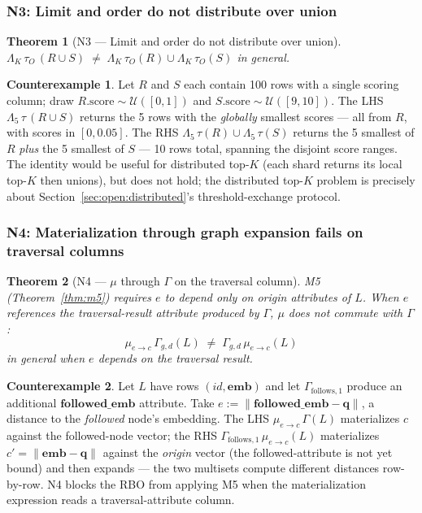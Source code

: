 \documentclass[acmsmall,review,anonymous]{acmart}
\theoremstyle{plain}
\newtheorem{theorem}{Theorem}
\theoremstyle{definition}
\newtheorem{counterexample}{Counterexample}
\newcommand{\vect}[1]{\boldsymbol{#1}}
\theoremstyle{remark}
\begin{document}
\subsubsection{N3: Limit and order do not distribute over union}

\begin{theorem}[N3 --- Limit and order do not distribute over union]\label{thm:n3}
$\Lambda_K\, \tau_O\, (R \cup S) \;\neq\; \Lambda_K\, \tau_O(R) \cup
\Lambda_K\, \tau_O(S)$ in general.
\end{theorem}

\begin{counterexample}\label{ce:n3}
Let $R$ and $S$ each contain 100 rows with a single scoring
column; draw $R.\mathrm{score} \sim \mathcal{U}([0,1])$ and
$S.\mathrm{score} \sim \mathcal{U}([9,10])$. The LHS
$\Lambda_5\,\tau\,(R \cup S)$ returns the 5 rows with the
\emph{globally} smallest scores --- all from $R$, with scores
in $[0, 0.05]$. The RHS $\Lambda_5\,\tau(R) \cup \Lambda_5\,\tau(S)$
returns the 5 smallest of $R$ \emph{plus} the 5 smallest of $S$
--- 10 rows total, spanning the disjoint score ranges. The
identity would be useful for distributed top-$K$ (each shard
returns its local top-$K$ then unions), but does not hold; the
distributed top-$K$ problem is precisely about
Section~\ref{sec:open:distributed}'s threshold-exchange protocol.
\end{counterexample}

\subsubsection{N4: Materialization through graph expansion fails on traversal columns}

\begin{theorem}[N4 --- $\mu$ through $\Gamma$ on the traversal column]\label{thm:n4}
M5 (Theorem~\ref{thm:m5}) requires $e$ to depend only on
\emph{origin} attributes of $L$. When $e$ references the
traversal-result attribute produced by $\Gamma$, $\mu$ does
\emph{not} commute with $\Gamma$:
\[
\mu_{e \to c}\, \Gamma_{g, d}(L) \;\neq\;
\Gamma_{g, d}\, \mu_{e \to c}(L)
\]
in general when $e$ depends on the traversal result.
\end{theorem}

\begin{counterexample}\label{ce:n4}
Let $L$ have rows $(\mathit{id}, \vect{emb})$ and let
$\Gamma_{\mathrm{follows},1}$ produce an additional
$\vect{followed\_emb}$ attribute. Take
$e := \lVert \vect{followed\_emb} - \vect{q} \rVert$, a
distance to the \emph{followed} node's embedding. The LHS
$\mu_{e \to c}\,\Gamma(L)$ materializes $c$ against the
followed-node vector; the RHS
$\Gamma_{\mathrm{follows},1}\,\mu_{e \to c}(L)$ materializes
$c' = \lVert \vect{emb} - \vect{q} \rVert$ against the
\emph{origin} vector (the followed-attribute is not yet
bound) and then expands --- the two multisets compute
different distances row-by-row. N4 blocks the RBO from
applying M5 when the materialization expression reads a
traversal-attribute column.
\end{counterexample}
\end{document}
